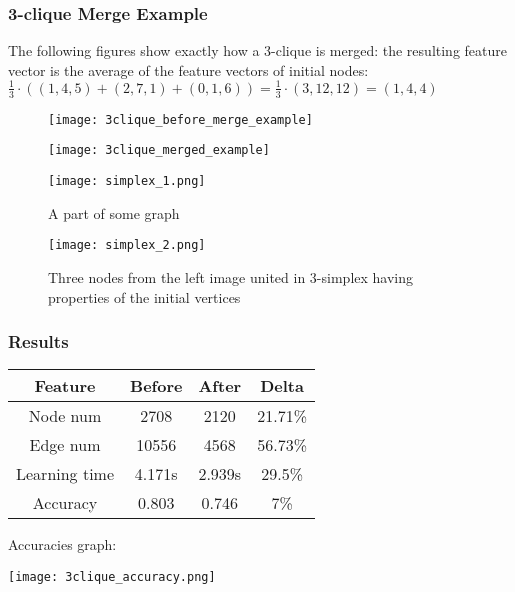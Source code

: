 \begin{frame}[allowframebreaks]
	\frametitle{3-clique Merge Example}

	The following figures show exactly how a 3-clique is merged: the resulting feature vector is the average of the feature vectors of initial nodes: $\frac{1}{3} \cdot \left( (1, 4, 5) + (2, 7, 1) + (0, 1, 6) \right) = \frac{1}{3} \cdot (3, 12, 12) = (1, 4, 4)$
	
	\begin{figure}[h]
		\begin{minipage}{.7\textwidth}
		  \centering
		  \texttt{[image: 3clique\_before\_merge\_example]}
		\end{minipage}%
		\begin{minipage}{.3\textwidth}
		  \centering
			\texttt{[image: 3clique\_merged\_example]}
		\end{minipage}
	\end{figure}
	
	\framebreak

  \begin{figure}[h]
	  \begin{multicols}{2}
		  \centering
		  \texttt{[image: simplex\_1.png]}
		  \caption{A part of some graph}\label{fig:clique_merged}

			\centering
			\texttt{[image: simplex\_2.png]}
			\caption{Three nodes from the left image united in 3-simplex having properties of the initial vertices}
		\end{multicols}
	\end{figure}
\end{frame}

\begin{frame}[allowframebreaks]
	\frametitle{Results}
	
	\centering
	\begin{tabular}{ |c|c|c|c| }
		\hline
	 	Feature & Before & After & Delta \\
		\hline
		Node num & 2708 & 2120 & 21.71\% \\
		Edge num & 10556 & 4568 & 56.73\% \\
		Learning time & 4.171s & 2.939s & 29.5\% \\
		Accuracy & 0.803 & 0.746 & 7\% \\
	 \hline
	\end{tabular}

	\framebreak
	
	Accuracies graph:
	\begin{center}
		\texttt{[image: 3clique\_accuracy.png]}
	\end{center}
\end{frame}

